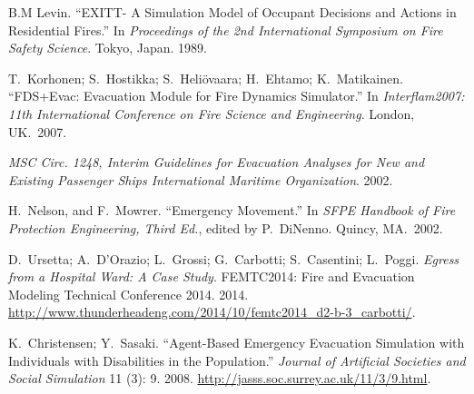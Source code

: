 \documentclass{style/llncs}
\begin{document}
{\begin{thebibliography}{36}
B.M Levin. \textquotedblleft{}EXITT- A Simulation Model of Occupant Decisions and Actions in Residential Fires.\textquotedblright{} In \emph{Proceedings of the 2nd International Symposium on Fire Safety Science}. Tokyo, Japan. 1989.\label{7}%

T.~Korhonen; S.~Hostikka; S.~Heliövaara; H.~Ehtamo; K.~Matikainen. \textquotedblleft{}FDS+Evac: Evacuation Module for Fire Dynamics Simulator.\textquotedblright{} In \emph{Interflam2007: 11th International Conference on Fire Science and Engineering}. London, UK.~2007.\label{15}%

\emph{MSC Circ. 1248, Interim Guidelines for Evacuation Analyses for New and Existing Passenger Ships International Maritime Organization}. 2002.\label{23}%

H.~Nelson, and F.~Mowrer. \textquotedblleft{}Emergency Movement.\textquotedblright{} In \emph{SFPE Handbook of Fire Protection Engineering, Third Ed.}, edited by P.~DiNenno. Quincy, MA.~2002.\label{33}%

D.~Ursetta; A.~D’Orazio; L.~Grossi; G.~Carbotti; S.~Casentini; L.~Poggi. \emph{Egress from a Hospital Ward: A Case Study}. FEMTC2014: Fire and Evacuation Modeling Technical Conference 2014. 2014. \href{http://www.thunderheadeng.com/2014/10/femtc2014_d2-b-3_carbotti/}{{\ttfamily http://\hspace{0pt}www.\hspace{0pt}thunderheadeng.\hspace{0pt}com/\hspace{0pt}2014/\hspace{0pt}10/\hspace{0pt}femtc2014\_\hspace{0pt}d2-\hspace{0pt}b-\hspace{0pt}3\_\hspace{0pt}carbotti/\hspace{0pt}}}.\label{19}%

K.~Christensen; Y.~Sasaki. \textquotedblleft{}Agent-Based Emergency Evacuation Simulation with Individuals with Disabilities in the Population.\textquotedblright{} \emph{Journal of Artificial Societies and Social Simulation} 11 (3): 9. 2008. \href{http://jasss.soc.surrey.ac.uk/11/3/9.html}{{\ttfamily http://\hspace{0pt}jasss.\hspace{0pt}soc.\hspace{0pt}surrey.\hspace{0pt}ac.\hspace{0pt}uk/\hspace{0pt}11/\hspace{0pt}3/\hspace{0pt}9.\hspace{0pt}html}}.\label{8}%


\end{thebibliography}}
\end{document}
